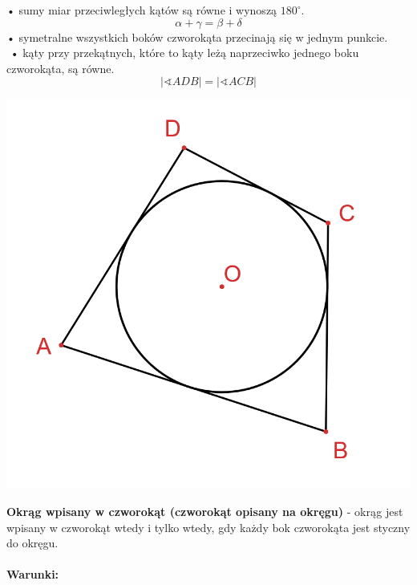 \documentclass[14pt,a4paper]{extarticle}
\begin{document}
\noindent \;\;\;\;• \:sumy miar przeciwległych kątów są równe i wynoszą $180^{\circ}$.
$$\alpha + \gamma = \beta + \delta$$
\noindent \;\;\;\;• \:symetralne wszystkich boków czworokąta przecinają się w jednym punkcie.\\${}$
\noindent \;\;\;• \:kąty przy przekątnych, które to kąty leżą naprzeciwko jednego boku czworokąta, są równe.
$$\vert \sphericalangle ADB\vert = \vert \sphericalangle ACB \vert$$

\newpage

\begin{center}\includegraphics[scale=0.5]{geometria/okrąg wpisany w czworokąt.png}\end{center}
\noindent \textbf{Okrąg wpisany w czworokąt (czworokąt opisany na okręgu)} - okrąg jest wpisany w 
czworokąt wtedy i tylko wtedy, gdy każdy bok czworokąta jest styczny do okręgu.\\\\
\noindent \textbf{Warunki:}
\MoveBelowBox\unskip
\end{document}
